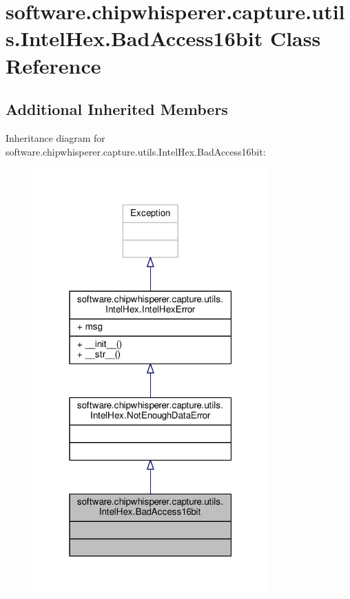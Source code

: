 \hypertarget{classsoftware_1_1chipwhisperer_1_1capture_1_1utils_1_1IntelHex_1_1BadAccess16bit}{}\section{software.\+chipwhisperer.\+capture.\+utils.\+Intel\+Hex.\+Bad\+Access16bit Class Reference}
\label{classsoftware_1_1chipwhisperer_1_1capture_1_1utils_1_1IntelHex_1_1BadAccess16bit}
\subsection*{Additional Inherited Members}


Inheritance diagram for software.\+chipwhisperer.\+capture.\+utils.\+Intel\+Hex.\+Bad\+Access16bit\+:\nopagebreak
\begin{figure}[H]
\begin{center}
\leavevmode
\includegraphics[width=256pt]{d1/d7d/classsoftware_1_1chipwhisperer_1_1capture_1_1utils_1_1IntelHex_1_1BadAccess16bit__inherit__graph}
\end{center}
\end{figure}


